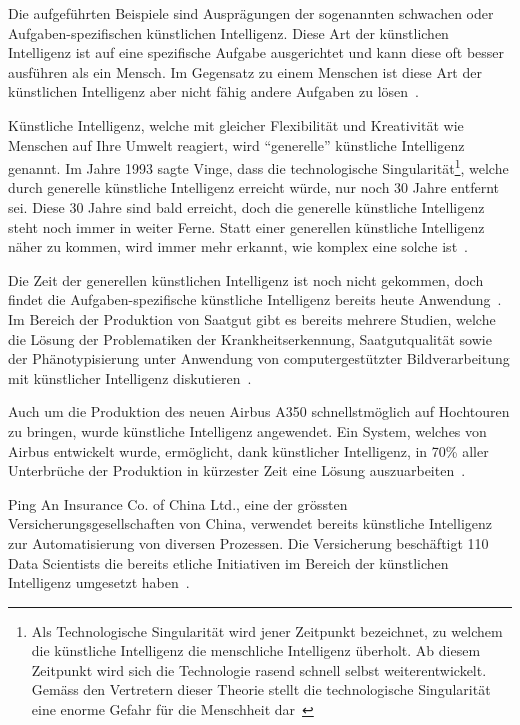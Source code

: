 Die aufgeführten Beispiele sind Ausprägungen der sogenannten schwachen oder Aufgaben-spezifischen künstlichen Intelligenz. Diese Art der künstlichen Intelligenz ist auf eine spezifische Aufgabe ausgerichtet und kann diese oft besser ausführen als ein Mensch. Im Gegensatz zu einem Menschen ist diese Art der künstlichen Intelligenz aber nicht fähig andere Aufgaben zu lösen~\autocite{Lu2018}.

Künstliche Intelligenz, welche mit gleicher Flexibilität und Kreativität wie Menschen auf Ihre Umwelt reagiert, wird \enquote{generelle} künstliche Intelligenz genannt. Im Jahre 1993 sagte Vinge, dass die technologische Singularität\footnote{Als Technologische Singularität wird jener Zeitpunkt bezeichnet, zu welchem die künstliche Intelligenz die menschliche Intelligenz überholt. Ab diesem Zeitpunkt wird sich die Technologie rasend schnell selbst weiterentwickelt. Gemäss den Vertretern dieser Theorie stellt die technologische Singularität eine enorme Gefahr für die Menschheit dar~\autocite{Tredinnick2017}}, welche durch generelle künstliche Intelligenz erreicht würde, nur noch 30 Jahre entfernt sei. Diese 30 Jahre sind bald erreicht, doch die generelle künstliche Intelligenz steht noch immer in weiter Ferne. Statt einer generellen künstliche Intelligenz näher zu kommen, wird immer mehr erkannt, wie komplex eine solche ist~\autocite{Tredinnick2017}.

Die Zeit der generellen künstlichen Intelligenz ist noch nicht gekommen, doch findet die Aufgaben-spezifische künstliche Intelligenz bereits heute Anwendung~\autocite{Tredinnick2017}. Im Bereich der Produktion von Saatgut gibt es bereits mehrere Studien, welche die Lösung der Problematiken der Krankheitserkennung, Saatgutqualität sowie der Phänotypisierung unter Anwendung von computergestützter Bildverarbeitung mit künstlicher Intelligenz diskutieren~\autocite{Patricio2018}. 

Auch um die Produktion des neuen Airbus A350 schnellstmöglich auf Hochtouren zu bringen, wurde künstliche Intelligenz angewendet. Ein System, welches von Airbus entwickelt wurde, ermöglicht, dank künstlicher Intelligenz, in 70\% aller Unterbrüche der Produktion in kürzester Zeit eine Lösung auszuarbeiten~\autocite{Ransbotham2017}.

Ping An Insurance Co. of China Ltd., eine der grössten Versicherungsgesellschaften von China, verwendet bereits künstliche Intelligenz zur Automatisierung von diversen Prozessen. Die Versicherung beschäftigt 110 Data Scientists die bereits etliche Initiativen im Bereich der künstlichen Intelligenz umgesetzt haben~\autocite{Ransbotham2017}.

